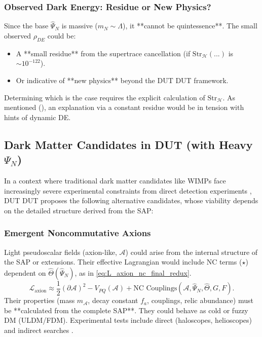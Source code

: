 \documentclass[11pt, a4paper]{article}
\theoremstyle{remark}
\newcommand{\Op}[1]{\hat{#1}}
\newcommand{\Str}{\mathrm{Str}}
\begin{document}
\subsubsection{Observed Dark Energy: Residue or New Physics?}
\label{sec:observed_dark_energy_revised}
Since the base \( \Op{\Psi}_N \) is massive (\( m_N \sim \Lambda \)), it **cannot be quintessence**. The small observed \( \rho_{DE} \) could be:
\begin{itemize}
    \item A **small residue** from the supertrace cancellation (if \( \Str_{\mathcal{H}}(...) \) is \( \sim 10^{-122} \)).
    \item Or indicative of **new physics** beyond the DUT DUT framework.
\end{itemize}
Determining which is the case requires the explicit calculation of \( \Str_{\mathcal{H}} \). As mentioned (), an explanation via a constant residue would be in tension with hints of dynamic DE.

\subsection{Dark Matter Candidates in DUT (with Heavy \texorpdfstring{$\Psi_N$}{PsiN})}
\label{subsec:dark_matter_final_revised}

In a context where traditional dark matter candidates like WIMPs face increasingly severe experimental constraints from direct detection experiments \citep[see summary in][]{PDG2022}, DUT DUT proposes the following alternative candidates, whose viability depends on the detailed structure derived from the SAP:

\subsubsection{Emergent Noncommutative Axions}
\label{sec:axiones_nc_final_revised}
Light pseudoscalar fields (axion-like, \( \mathcal{A} \)) could arise from the internal structure of the SAP or extensions. Their effective Lagrangian would include NC terms (\( \star \)) dependent on \( \Op{\Theta}(\Op{\Psi}_N) \), as in \eqref{eq:L_axion_nc_final_redux}.
\begin{equation} \label{eq:L_axion_nc_final_redux}
\mathcal{L}_{\text{axion}} \approx \frac{1}{2} (\partial \mathcal{A})^2 - V_{PQ}(\mathcal{A}) + \text{NC Couplings}(\mathcal{A}, \Op{\Psi}_N, \Op{\Theta}, G, F).
\end{equation}
Their properties (mass \( m_{\mathcal{A}} \), decay constant \( f_a \), couplings, relic abundance) must be **calculated from the complete SAP**. They could behave as cold or fuzzy DM (ULDM/FDM). Experimental tests include direct (haloscopes, helioscopes) and indirect searches \citep{PDG2022, PerezGarcia2024}. %
\end{document}
